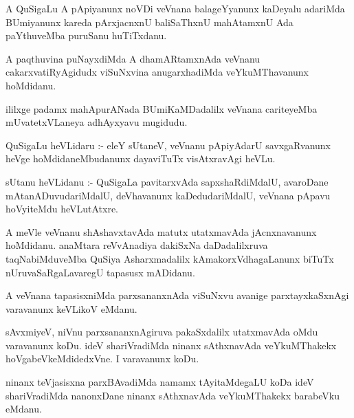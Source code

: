 \documentclass{article}
\begin{document}
\begin{mn}
A QuSigaLu A pApiyanunx noVDi veVnana balageYyanunx kaDeyalu adariMda BUmiyanunx kareda 
pArxjacnxnU baliSaThxnU mahAtamxnU Ada paYthuveMba puruSanu huTiTxdanu.
\end{mn}

\begin{mn}
A paqthuvina puNayxdiMda A dhamARtamxnAda veVnanu cakarxvatiRyAgidudx 
viSuNxvina anugarxhadiMda veYkuMThavanunx hoMdidanu.
\end{mn}

\begin{mn}
ililxge padamx mahApurANada BUmiKaMDadalilx veVnana cariteyeMba mUvatetxVLaneya adhAyxyavu mugidudu.
\end{mn}




\begin{mn}
QuSigaLu heVLidaru :- eleY sUtaneV, veVnanu pApiyAdarU savxgaRvanunx heVge 
hoMdidaneMbudanunx dayaviTuTx visAtxravAgi heVLu.
\end{mn}

\begin{mn}
sUtanu heVLidanu :- QuSigaLa pavitarxvAda sapxshaRdiMdalU, avaroDane mAtanADuvudariMdalU,  
deVhavanunx kaDedudariMdalU, veVnana pApavu hoVyiteMdu heVLutAtxre.
\end{mn}

\begin{mn}
A meVle veVnanu shAshavxtavAda matutx utatxmavAda jAcnxnavanunx hoMdidanu.  
anaMtara  reVvAnadiya dakiSxNa daDadalilxruva taqNabiMduveMba QuSiya Asharxmadalilx 
kAmakorxVdhagaLanunx biTuTx nUruvaSaRgaLavaregU tapasusx mADidanu.
\end{mn}

\begin{mn}
A veVnana tapasisxniMda parxsananxnAda viSuNxvu avanige parxtayxkaSxnAgi varavanunx keVLikoV eMdanu.
\end{mn}

\begin{mn}
sAvxmiyeV, niVnu parxsananxnAgiruva pakaSxdalilx utatxmavAda oMdu varavanunx koDu.  ideV 
shariVradiMda ninanx sAthxnavAda  veYkuMThakekx  hoVgabeVkeMdidedxVne.  I varavanunx koDu.
\end{mn}

\begin{mn}
ninanx teVjasisxna parxBAvadiMda namamx tAyitaMdegaLU  koDa ideV shariVradiMda 
nanonxDane ninanx sAthxnavAda veYkuMThakekx barabeVku eMdanu.
\end{mn}
\end{document}
